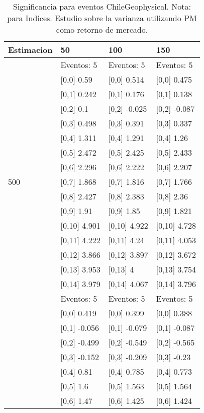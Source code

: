 \begin{table}

\caption{Significancia para eventos ChileGeophysical. Nota: para Indices. Estudio sobre la varianza utilizando PM como retorno de mercado.}
\centering
\begin{tabular}[t]{llll}
\toprule
Estimacion & 50 & 100 & 150\\
\midrule
 & Eventos:  5 & Eventos:  5 & Eventos:  5\\
 & {}[0,0] 0.59 & {}[0,0] 0.514 & {}[0,0] 0.475\\
 & {}[0,1] 0.242 & {}[0,1] 0.176 & {}[0,1] 0.138\\
 & {}[0,2] 0.1 & {}[0,2] -0.025 & {}[0,2] -0.087\\
 & {}[0,3] 0.498 & {}[0,3] 0.391 & {}[0,3] 0.337\\
\addlinespace
 & {}[0,4] 1.311 & {}[0,4] 1.291 & {}[0,4] 1.26\\
 & {}[0,5] 2.472 & {}[0,5] 2.425 & {}[0,5] 2.433\\
 & {}[0,6] 2.296 & {}[0,6] 2.222 & {}[0,6] 2.207\\
500 & {}[0,7] 1.868 & {}[0,7] 1.816 & {}[0,7] 1.766\\
 & {}[0,8] 2.427 & {}[0,8] 2.383 & {}[0,8] 2.36\\
\addlinespace
 & {}[0,9] 1.91 & {}[0,9] 1.85 & {}[0,9] 1.821\\
 & {}[0,10] 4.901 & {}[0,10] 4.922 & {}[0,10] 4.728\\
 & {}[0,11] 4.222 & {}[0,11] 4.24 & {}[0,11] 4.053\\
 & {}[0,12] 3.866 & {}[0,12] 3.897 & {}[0,12] 3.672\\
 & {}[0,13] 3.953 & {}[0,13] 4 & {}[0,13] 3.754\\
\addlinespace
 & {}[0,14] 3.979 & {}[0,14] 4.067 & {}[0,14] 3.796\\
 & Eventos:  5 & Eventos:  5 & Eventos:  5\\
 & {}[0,0] 0.419 & {}[0,0] 0.399 & {}[0,0] 0.388\\
 & {}[0,1] -0.056 & {}[0,1] -0.079 & {}[0,1] -0.087\\
 & {}[0,2] -0.499 & {}[0,2] -0.549 & {}[0,2] -0.565\\
\addlinespace
 & {}[0,3] -0.152 & {}[0,3] -0.209 & {}[0,3] -0.23\\
 & {}[0,4] 0.81 & {}[0,4] 0.785 & {}[0,4] 0.773\\
 & {}[0,5] 1.6 & {}[0,5] 1.563 & {}[0,5] 1.564\\
 & {}[0,6] 1.47 & {}[0,6] 1.425 & {}[0,6] 1.424\\

\end{tabular}
\end{table}
